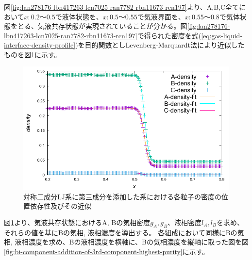 \documentclass[titlepage]{jsreport}
\begin{document}
\newpage
図\ref{fig:lan278176-lbn417263-lcn7025-ran7782-rbn11673-rcn197}より、A,B,C全てにおいて$x:0.2〜0.5$で液体状態を、$x:0.5〜0.55$で気液界面を、$x:0.55〜0.8$で気体状態をとる、気液共存状態が実現されていることが分かる。図\ref{fig:lan278176-lbn417263-lcn7025-ran7782-rbn11673-rcn197}で得られた密度を式(\ref{eq:gas-liquid-interface-density-profile})を目的関数としLevenberg-Marquardt法により近似したものを図\ref{fig:lan278176-lbn417263-lcn7025-ran7782-rbn11673-rcn197-fitting}に示す。

\begin{figure}[htbp]
    \begin{center}
        \includegraphics[width=14cm]{fig/lan278176-lbn417263-lcn7025-ran7782-rbn11673-rcn197/lan278176-lbn417263-lcn7025-ran7782-rbn11673-rcn197-fitting.pdf}
    \end{center}
    \caption{対称二成分LJ系に第三成分を添加した系における各粒子の密度の位置依存性及びその近似}
    \label{fig:lan278176-lbn417263-lcn7025-ran7782-rbn11673-rcn197-fitting}
\end{figure}

\newpage

図\ref{fig:lan278176-lbn417263-lcn7025-ran7782-rbn11673-rcn197-fitting}より、気液共存状態におけるA, Bの気相密度$g_A, g_B$、液相密度$l_A, l_B$を求め、それらの値を基にBの気相, 液相濃度を導出する。
各組成において同様にBの気相, 液相濃度を求め、Bの液相濃度を横軸に、Bの気相濃度を縦軸に取った図を図\ref{fig:bi-component-addition-of-3rd-component-highest-purity}に示す。
\end{document}

